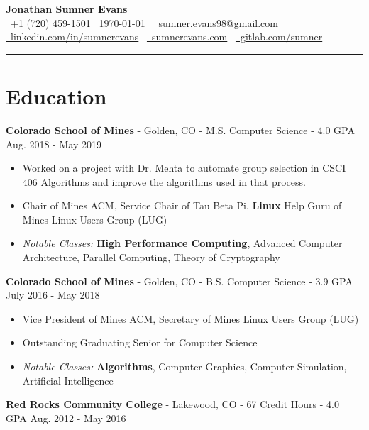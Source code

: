 \documentclass[10pt,letterpaper]{article}
\begin{document}
\begin{center}
    {\huge\textbf{Jonathan Sumner Evans}} \\
    \vspace{3pt}
    \faPhone\ +1 (720) 459-1501
    \textbar\ \today
    \textbar\ \href{mailto:sumner.evans98@gmail.com}{\faEnvelope\ sumner.evans98@gmail.com} \\
    \href{https://www.linkedin.com/in/sumnerevans}{\faLinkedin\ linkedin.com/in/sumnerevans}
    \textbar\ \href{https://sumnerevans.com}{\faGlobe\ sumnerevans.com}
    \textbar\ \href{https://gitlab.com/sumner}{\faGitlab\ gitlab.com/sumner}
    \rule{\textwidth}{0.5pt}
\end{center}

\section*{Education}
\textbf{Colorado School of Mines} - Golden, CO - M.S. Computer Science - 4.0 GPA
\hfill Aug. 2018 - May 2019
\begin{itemize}
    \item Worked on a project with Dr. Mehta to automate group selection in
        CSCI 406 Algorithms and improve the algorithms used in that process.
    \item Chair of Mines ACM, Service Chair of Tau Beta Pi, \textbf{Linux} Help
        Guru of Mines Linux Users Group (LUG)
    \item \textit{Notable Classes:} \textbf{High Performance Computing},
        Advanced Computer Architecture, Parallel Computing, Theory of
        Cryptography
\end{itemize}

\textbf{Colorado School of Mines} - Golden, CO - B.S. Computer Science - 3.9 GPA
\hfill July 2016 - May 2018
\begin{itemize}
    \item Vice President of Mines ACM, Secretary of Mines Linux Users Group
        (LUG)
    \item Outstanding Graduating Senior for Computer Science
    \item \textit{Notable Classes:} \textbf{Algorithms}, Computer Graphics,
        Computer Simulation, Artificial Intelligence
\end{itemize}

\vspace{2pt}
\textbf{Red Rocks Community College} - Lakewood, CO - 67 Credit Hours - 4.0 GPA
\hfill Aug. 2012 - May 2016
\end{document}
